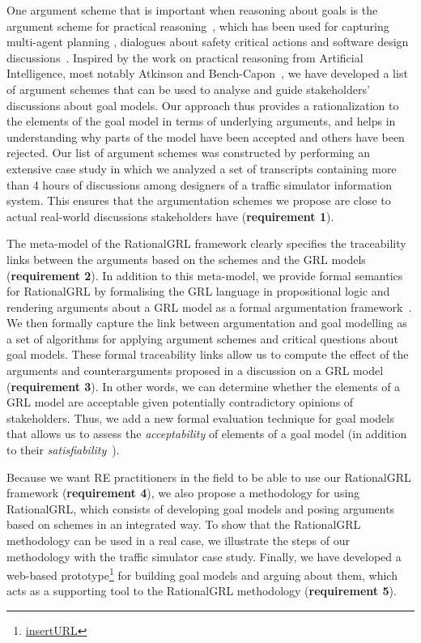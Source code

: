 One argument scheme that is important when reasoning about goals is the argument scheme for practical reasoning~\cite{walton1990,atkinson2007}, which has been used for capturing multi-agent planning \cite{medellin2013planning}, dialogues about safety critical actions \cite{tolchinsky2012deliberation} and software design discussions~\cite{BlackEtal2013}. Inspired by the work on practical reasoning from Artificial Intelligence, most notably Atkinson and Bench-Capon~\cite{atkinson2007}, we have developed a list of argument schemes that can be used to analyse and guide stakeholders' discussions about goal models. Our approach thus provides a rationalization to the elements of the goal model in terms of underlying arguments, and helps in understanding why parts of the model have been accepted and others have been rejected. Our list of argument schemes was constructed by performing an extensive case study in which we analyzed a set of transcripts containing more than 4 hours of discussions among designers of a traffic simulator information system. This ensures that the argumentation schemes we propose are close to actual real-world discussions stakeholders have (\textbf{requirement 1}).  

The meta-model of the RationalGRL framework clearly specifies the traceability links between the arguments based on the schemes and the GRL models (\textbf{requirement 2}). In addition to this meta-model, we provide formal semantics for RationalGRL by formalising the GRL language in propositional logic and rendering arguments about a GRL model as a formal argumentation framework~\cite{Dung1995}. We then formally capture the link between argumentation and goal modelling as a set of algorithms for applying argument schemes and critical questions about goal models. These formal traceability links allow us to compute the effect of the arguments and counterarguments proposed in a discussion on a GRL model (\textbf{requirement 3}). In other words, we can determine whether the elements of a GRL model are acceptable given potentially contradictory opinions of stakeholders. Thus, we add a new formal evaluation technique for goal models that allows us to assess the \emph{acceptability} of elements of a goal model (in addition to their \emph{satisfiability}~\cite{Amyot:2010:EGM:1841349.1841356}).

Because we want RE practitioners in the field to be able to use our RationalGRL framework (\textbf{requirement 4}), we also propose a methodology for using RationalGRL, which consists of developing goal models and posing arguments based on schemes in an integrated way. To show that the RationalGRL methodology can be used in a real case, we illustrate the steps of our methodology with the traffic simulator case study. Finally, we have developed a web-based prototype\footnote{\url{insertURL}} for building goal models and arguing about them, which acts as a supporting tool to the RationalGRL methodology (\textbf{requirement 5}). 

